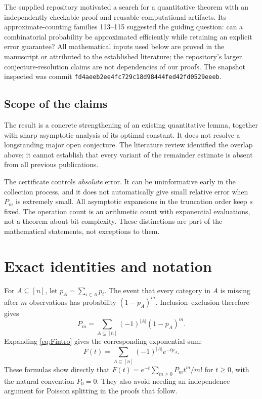 \documentclass[11pt,a4paper]{article}
\theoremstyle{definition}
\begin{document}
The supplied repository \cite{OpenAIMath2026} motivated a search for a
quantitative theorem with an independently checkable proof and reusable
computational artifacts. Its approximate-counting families 113--115
suggested the guiding question: can a combinatorial probability be
approximated efficiently while retaining an explicit error guarantee?
All mathematical inputs used below are proved
in the manuscript or attributed to the established literature; the
repository's larger conjecture-resolution claims are not dependencies of
our proofs. The snapshot inspected was commit
\texttt{fd4aeeb2ee4fc729c18d98444fed42fd0529eeeb}.

\subsection{Scope of the claims}

The result is a concrete strengthening of an existing quantitative lemma,
together with sharp asymptotic analysis of its optimal constant. It does
not resolve a longstanding major open conjecture. The literature review
identified the overlap above; it cannot establish that every variant of
the remainder estimate is absent from all previous publications.

The certificate controls \emph{absolute} error. It can be uninformative
early in the collection process, and it does not automatically give small
relative error when $P_m$ is extremely small. All asymptotic expansions in
the truncation order keep $s$ fixed. The operation count is an arithmetic
count with exponential evaluations, not a theorem about bit complexity.
These distinctions are part of the mathematical statements, not exceptions
to them.

\section{Exact identities and notation}\label{sec:identities}

For $A\subseteq[n]$, let $p_A=\sum_{i\in A}p_i$. The event that every
category in $A$ is missing after $m$ observations has probability
$(1-p_A)^m$. Inclusion--exclusion therefore gives
\begin{equation}\label{eq:IE}
 P_m=\sum_{A\subseteq[n]}(-1)^{|A|}(1-p_A)^m.
\end{equation}
Expanding \eqref{eq:Fintro} gives the corresponding exponential sum:
\begin{equation}\label{eq:Fsum}
 F(t)=\sum_{A\subseteq[n]}(-1)^{|A|}e^{-tp_A}.
\end{equation}
These formulas show directly that
$F(t)=e^{-t}\sum_{m\ge0}P_m t^m/m!$ for $t\ge0$, with the natural
convention $P_0=0$. They also avoid needing an independence argument for
Poisson splitting in the proofs that follow.
\end{document}

